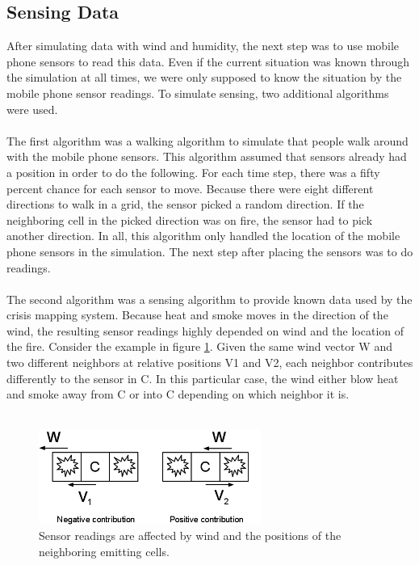 \subsection{Sensing Data}
After simulating data with wind and humidity, the next step was to use mobile phone sensors to read this data. Even if the current situation was known through the simulation at all times, we were only supposed to know the situation by the mobile phone sensor readings. To simulate sensing, two additional algorithms were used.
\\\\
The first algorithm was a walking algorithm to simulate that people walk around with the mobile phone sensors. This algorithm assumed that sensors already had a position in order to do the following. For each time step, there was a fifty percent chance for each sensor to move. Because there were eight different directions to walk in a grid, the sensor picked a random direction. If the neighboring cell in the picked direction was on fire, the sensor had to pick another direction. In all, this algorithm only handled the location of the mobile phone sensors in the simulation. The next step after placing the sensors was to do readings.
\\\\
The second algorithm was a sensing algorithm to provide known data used by the crisis mapping system. Because heat and smoke moves in the direction of the wind, the resulting sensor readings highly depended on wind and the location of the fire. Consider the example in figure \ref{fig:sense-concept}. Given the same wind vector W and two different neighbors at relative positions V1 and V2, each neighbor contributes differently to the sensor in C. In this particular case, the wind either blow heat and smoke away from C or into C depending on which neighbor it is.
\\\\
\begin{figure}[here]
\centering
\includegraphics[width=0.65\textwidth]{solution/graphics/sense-concept.png}
\caption{Sensor readings are affected by wind and the positions of the neighboring emitting cells.}
\label{fig:sense-concept}
\end{figure}
